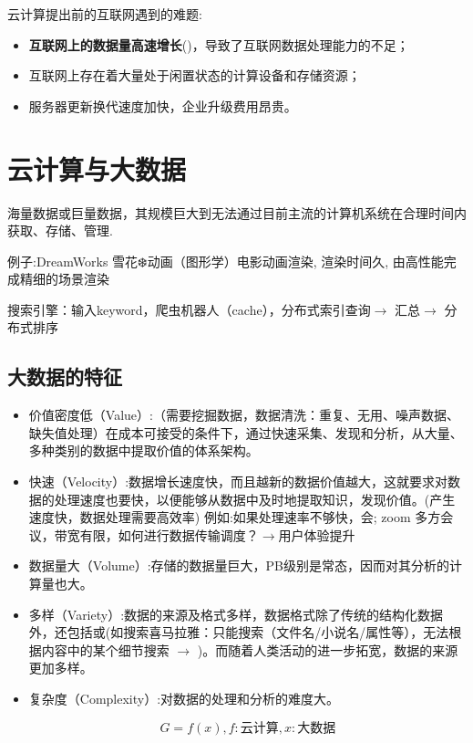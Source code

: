 云计算提出前的互联网遇到的难题:
\begin{itemize}
    \item \textbf{互联网上的数据量高速增长}()，导致了互联网数据处理能力的不足；
    \item 互联网上存在着大量处于闲置状态的计算设备和存储资源；
    \item 服务器更新换代速度加快，企业升级费用昂贵。
\end{itemize}

\section{云计算与大数据}

\begin{definition}
    海量数据或巨量数据，其规模巨大到无法通过目前主流的计算机系统在合理时间内获取、存储、管理.
\end{definition}

例子:DreamWorks 雪花❄️动画（图形学）电影动画渲染, 渲染时间久, 由高性能完成精细的场景渲染

搜索引擎：输入keyword，爬虫机器人（cache），分布式索引查询$\rightarrow$ 汇总$\rightarrow$ 分布式排序

\subsection{大数据的特征}

\begin{itemize}
    \item 价值密度低（Value）:（需要挖掘数据，数据清洗：重复、无用、噪声数据、缺失值处理）在成本可接受的条件下，通过快速采集、发现和分析，从大量、多种类别的数据中提取价值的体系架构。

    \item 快速（Velocity）:数据增长速度快，而且越新的数据价值越大，这就要求对数据的处理速度也要快，以便能够从数据中及时地提取知识，发现价值。(产生速度快，数据处理需要高效率) 例如:如果处理速率不够快，会; zoom 多方会议，带宽有限，如何进行数据传输调度？$\rightarrow$用户体验提升

    \item 数据量大（Volume）:存储的数据量巨大，PB级别是常态，因而对其分析的计算量也大。

    \item  多样（Variety）:数据的来源及格式多样，数据格式除了传统的结构化数据外，还包括或(如搜索喜马拉雅：只能搜索（文件名/小说名/属性等），无法根据内容中的某个细节搜索 $\rightarrow$ )。而随着人类活动的进一步拓宽，数据的来源更加多样。

   \item 复杂度（Complexity）:对数据的处理和分析的难度大。

   $$G=f(x), f:\text{云计算}, x:\text{大数据}$$
\end{itemize}



